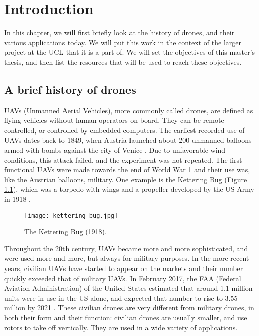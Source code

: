 \chapter{Introduction} %
In this chapter, we will first briefly look at the history of drones, and their various applications today. We will put this work in the context of the larger project at the UCL that it is a part of. We will set the objectives of this master's thesis, and then list the resources that will be used to reach these objectives.

\section{A brief history of drones}
UAVs (Unmanned Aerial Vehicles), more commonly called drones, are defined as flying vehicles without human operators on board. They can be remote-controlled, or controlled by embedded computers. The earliest recorded use of UAVs dates back to 1849, when Austria launched about 200 unmanned balloons armed with bombs against the city of Venice \cite{anthology}. Due to unfavorable wind conditions, this attack failed, and the experiment was not repeated. The first functional UAVs were made towards the end of World War 1 and their use was, like the Austrian balloons, military. One example is the Kettering Bug (Figure \ref{fig:ketteringbug}), which was a torpedo with wings and a propeller developed by the US Army in 1918 \cite{dronesww1}.
\begin{figure}[H]
  \centering
  \texttt{[image: kettering\_bug.jpg]}
    \caption{The Kettering Bug (1918).}
    \label{fig:ketteringbug}
\end{figure}

Throughout the 20th century, UAVs became more and more sophisticated, and were used more and more, but always for military purposes. In the more recent years, civilian UAVs have started to appear on the markets and their number quickly exceeded that of military UAVs. In February 2017, the FAA (Federal Aviation Administration) of the United States estimated that around 1.1 million units were in use in the US alone, and expected that number to rise to 3.55 million by 2021 \cite{consumerdronesbythenumbers}. These civilian drones are very different from military drones, in both their form and their function: civilian drones are usually smaller, and use rotors to take off vertically. They are used in a wide variety of applications.

